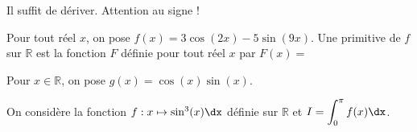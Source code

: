 \documentclass[11pt,fleqn, openany]{book} %
\begin{document}
\begin{demonstration}Il suffit de dériver. Attention au signe !\end{demonstration}

\begin{example}Pour tout réel $x$, on pose $f(x)=3\cos(2x)-5\sin(9x)$.
Une primitive de $f$ sur $\mathbb{R}$ est la fonction $F$ définie pour tout réel $x$ par $F(x)=$\end{example}

\begin{example}Pour $x\in\mathbb{R}$, on pose $g(x)=\cos(x)\sin(x)$. 

\vskip20pt
\end{example}

\begin{example}On considère la fonction $f:x\mapsto \sin^3(x)\dx$ définie sur $\mathbb{R}$ et $I=\displaystyle\int_0^{\pi} f(x)\dx$.

\vskip220pt
\end{example}
\end{document}
